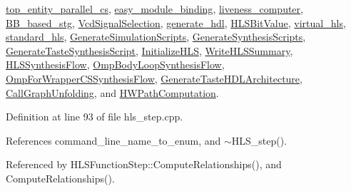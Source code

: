 \hyperlink{classtop__entity__parallel__cs_a619b309604994e682d4f2c4f0989efde}{top\+\_\+entity\+\_\+parallel\+\_\+cs}, \hyperlink{classeasy__module__binding_a627ae750079d8db60409f696cb1310c9}{easy\+\_\+module\+\_\+binding}, \hyperlink{classliveness__computer_a9b84eb26166083179eec5570e27e3d95}{liveness\+\_\+computer}, \hyperlink{classBB__based__stg_aea701ad71c3a60c0f6abe3a7f0ca38c9}{B\+B\+\_\+based\+\_\+stg}, \hyperlink{classVcdSignalSelection_ae6f9acf47344a58c2d762308d3d0c97f}{Vcd\+Signal\+Selection}, \hyperlink{classgenerate__hdl_a87b4ff40c6f91b64283253b1c1122c8f}{generate\+\_\+hdl}, \hyperlink{classHLSBitValue_ada9226f3cb7ef2e1f48d9268e440fa48}{H\+L\+S\+Bit\+Value}, \hyperlink{classvirtual__hls_abf09f6655b1a871eec7bd61bc6c9d1dd}{virtual\+\_\+hls}, \hyperlink{classstandard__hls_a7a8577eba64be4ca572350446879d82c}{standard\+\_\+hls}, \hyperlink{classGenerateSimulationScripts_ac858ec8a3c5b84ecdc5e0f65be2774d6}{Generate\+Simulation\+Scripts}, \hyperlink{classGenerateSynthesisScripts_a1f8c29d2d284394856b4036bd986140a}{Generate\+Synthesis\+Scripts}, \hyperlink{classGenerateTasteSynthesisScript_a1100f2d9ab2b4d5cc3ae87ef751c9097}{Generate\+Taste\+Synthesis\+Script}, \hyperlink{classInitializeHLS_a2804a23ba47f9c42d9474cec67d6a673}{Initialize\+H\+LS}, \hyperlink{classWriteHLSSummary_ab29ce95624208cd40c9cef9603c349bf}{Write\+H\+L\+S\+Summary}, \hyperlink{classHLSSynthesisFlow_ab50e0c7e5ddf4bc0e977f2fb2d1b3d21}{H\+L\+S\+Synthesis\+Flow}, \hyperlink{classOmpBodyLoopSynthesisFlow_aaac534ef1f8dd35556e17e11abfcb76c}{Omp\+Body\+Loop\+Synthesis\+Flow}, \hyperlink{classOmpForWrapperCSSynthesisFlow_a63a3f829cae1a393afe534a95d2b1de0}{Omp\+For\+Wrapper\+C\+S\+Synthesis\+Flow}, \hyperlink{classGenerateTasteHDLArchitecture_a5599d8faaf3bda18a5b8a45875e4abb4}{Generate\+Taste\+H\+D\+L\+Architecture}, \hyperlink{classCallGraphUnfolding_af8507af00670b0bd8b00b56d20c829f1}{Call\+Graph\+Unfolding}, and \hyperlink{classHWPathComputation_ace7b922eaba88a8247ff44dd25ae3dbe}{H\+W\+Path\+Computation}.



Definition at line 93 of file hls\+\_\+step.\+cpp.



References command\+\_\+line\+\_\+name\+\_\+to\+\_\+enum, and $\sim$\+H\+L\+S\+\_\+step().



Referenced by H\+L\+S\+Function\+Step\+::\+Compute\+Relationships(), and Compute\+Relationships().

